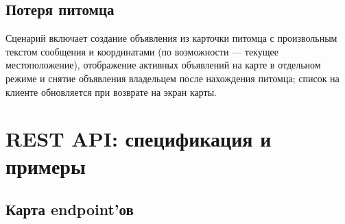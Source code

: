 \documentclass[12pt,a4paper]{article}
\begin{document}
\subsection{Потеря питомца}

Сценарий включает создание объявления из карточки питомца с произвольным текстом сообщения и координатами (по возможности --- текущее местоположение), отображение активных объявлений на карте в отдельном режиме и снятие объявления владельцем после нахождения питомца; список на клиенте обновляется при возврате на экран карты.


\section{REST API: спецификация и примеры}

\subsection{Карта endpoint'ов}
\end{document}
